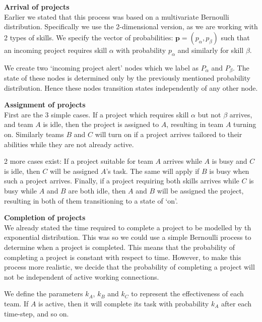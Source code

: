 \begin{steps}
	
	\item \textbf{Arrival of projects}\\
	Earlier we stated that this process was based on a multivariate Bernoulli distribution. Specifically we use the 2-dimensional version, as we are working with 2 types of skills. We specify the vector of probabilities: $\mathbf{p} = (p_\alpha, p_\beta)$ such that an incoming project requires skill $\alpha$ with probability $p_\alpha$ and similarly for skill $\beta$.
	
	We create two `incoming project alert' nodes which we label as $P_\alpha$ and $P_\beta$. The state of these nodes is determined only by the previously mentioned probability distribution. Hence these nodes transition states independently of any other node. 
	
	\item \textbf{Assignment of projects}\\
	First are the 3 simple cases. If a project which requires skill $\alpha$ but not $\beta$ arrives, and team $A$ is idle, then the project is assigned to $A$, resulting in team $A$ turning on. Similarly teams $B$ and $C$ will turn on if a project arrives tailored to their abilities while they are not already active.	
	
	2 more cases exist: If a project suitable for team $A$ arrives while $A$ is busy and $C$ is idle, then $C$ will be assigned $A$'s task. The same will apply if $B$ is busy when such a project arrives. Finally, if a project requiring both skills arrives while $C$ is busy while $A$ and $B$ are both idle, then $A$ and $B$ will be assigned the project, resulting in both of them transitioning to a state of `on'.
	
	\item \textbf{Completion of projects}\\
	We already stated the time required to complete a project to be modelled by th exponential distribution. This was so we could use a simple Bernoulli process to determine when a project is completed. This means that the probability of completing a project is constant with respect to time. However, to make this process more realistic, we decide that the probability of completing a project will not be independent of active working connections.
	
	We define the parameters $k_A$, $k_B$ and $k_C$ to represent the effectiveness of each team. If $A$ is active, then it will complete its task with probability $k_A$ after each time-step, and so on. 
	

\end{steps}
